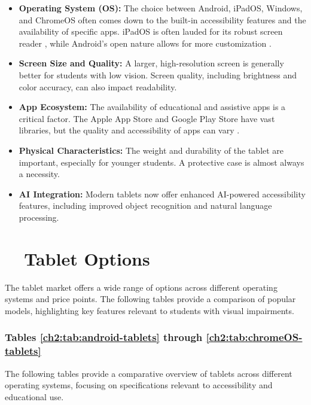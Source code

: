 \begin{itemize}
	\item \textbf{Operating System (OS):} The choice between Android, iPadOS, Windows, and ChromeOS often comes down to the built-in accessibility features and the availability of specific apps. iPadOS is often lauded for its robust  screen reader \supercite{AppleVoiceOver, AFBiOS}, while Android's open nature allows for more customization \supercite{AndroidAccessibility, GoogleTalkBack, SamsungAccessibility}.
	\item \textbf{Screen Size and Quality:} A larger, high-resolution screen is generally better for students with low vision. Screen quality, including brightness and color accuracy, can also impact readability.\supercite{AFBiOS, AAOTechnologyTools, BOIAScreenMagnifiers}
	\item \textbf{App Ecosystem:} The availability of educational and assistive apps is a critical factor. The Apple App Store and Google Play Store have vast libraries, but the quality and accessibility of apps can vary \supercite{AAOApps, Bookshare, VoiceDreamReader}.
	\item \textbf{Physical Characteristics:} The weight and durability of the tablet are important, especially for younger students. A protective case is almost always a necessity.\supercite{Day2021, Holbrook2006}
	\item \textbf{AI Integration:} Modern tablets now offer enhanced AI-powered accessibility features, including improved object recognition and natural language processing.\supercite{HIMSReleaseNotes, Android16Release, msseeingai, envision}
\end{itemize}

\section{~~Tablet Options}\label{ch2:sec:tablet-options}

The tablet market offers a wide range of options across different operating systems and price points. The following tables provide a comparison of popular models, highlighting key features relevant to students with visual impairments.

\subsubsection{Tables \ref{ch2:tab:android-tablets} through \ref{ch2:tab:chromeOS-tablets}}
The following tables provide a comparative overview of tablets across different operating systems, focusing on specifications relevant to \gls{accessibility} and educational use.

